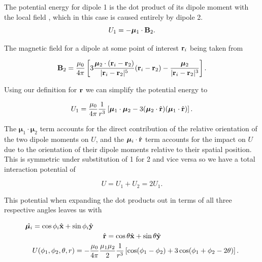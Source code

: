 \documentclass[prbg,preprint]{revtex4-1}
\newcommand{\cvec}[1]{{\rm{\bf{#1}}}}
\begin{document}
The potential energy for dipole 1 is the dot product of its dipole moment with the local field \cite{Edwards:2017aa}, which in this case is caused entirely by dipole 2.
\begin{equation}
U_1 = -\boldsymbol \mu_1 \cdot \cvec B_2.
\end{equation}

The magnetic field for a dipole at some point of interest $\cvec r_i$ being taken from \cite{griffiths2013introduction}

\begin{equation}
\cvec B_2 = 
\frac{\mu_0}{4\pi}\left[
	3\frac{\boldsymbol \mu_2 \cdot (\cvec r_i - \cvec r_2)}{|\cvec r_i - \cvec r_2|^5}(
	\cvec r_i - \cvec r_2
	)
	-\frac{\boldsymbol \mu_2}{|\cvec r_i - \cvec r_2|^3}
\right].
\end{equation}

Using our definition for $\cvec r$ we can simplify the potential energy to

\begin{equation}
U_1 = 
\frac{\mu_0}{4\pi}
\frac{1}{r^3}\left[
	\boldsymbol \mu_1 \cdot \boldsymbol \mu_2
	-3(
		\boldsymbol \mu_2 \cdot \hat {\cvec r}
		)(
		\boldsymbol \mu_1 \cdot \hat {\cvec r}		
		)
\right].
\end{equation}

The $\boldsymbol \mu_1 \cdot \boldsymbol \mu_2$ term accounts 
for the direct contribution of the relative orientation of the two dipole moments on $U$, 
and the $\boldsymbol \mu_i \cdot \hat {\cvec r}$ term accounts for the impact on $U$ due to the orientation of their dipole moments relative to their spatial position.
This is symmetric under substitution of 1 for 2 and vice versa so we have a total interaction potential of

\begin{equation}
U =
U_1+U_2
= 
2U_1.
\end{equation}

This potential when expanding the dot products out in terms of all three respective angles leaves us with

\begin{equation}
  \begin{multlined}
\hat {\boldsymbol \mu_i} =  \cos \phi_i \hat {\cvec x} + \sin \phi_i \hat {\cvec y}
\\
\hat {\cvec r} =  \cos \theta \hat {\cvec x} + \sin \theta \hat {\cvec y}
\\
U(\phi_1, \phi_2, \theta, r) =
-\frac{\mu_0}{4\pi}
\frac{\mu_1 \mu_2}{2}
\frac{1}{r^3}\left[
	\cos(\phi_1-\phi_2)
	+3\cos(\phi_1+\phi_2 -2\theta)
\right].
  \end{multlined}
\end{equation}
\end{document}
